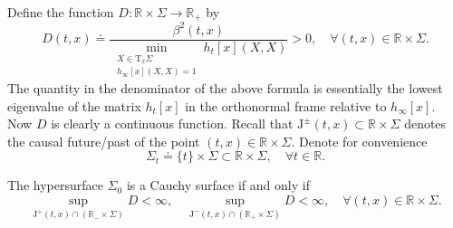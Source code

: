\documentclass{article}
\begin{document}
Define the function $D:\mathbb{R}\times\Sigma\to\mathbb{R}_+$ by
\begin{equation}
D(t,x)\doteq\frac{\beta^2(t,x)}{\min\limits_{\substack{X\in\mathrm{T}_x\Sigma\\h_\infty[x](X,X)=1}}h_t[x](X,X)}>0,\quad\forall (t,x)\in\mathbb{R}\times\Sigma.\label{DDef}
\end{equation}
The quantity in the denominator of the above formula is essentially the lowest eigenvalue of the matrix $h_t[x]$ in the orthonormal frame relative to $h_\infty[x]$. Now $D$ is clearly a continuous function. Recall that $\mathrm{J}^\pm(t,x)\subset\mathbb{R}\times\Sigma$ denotes the causal future/past of the point $(t,x)\in\mathbb{R}\times\Sigma$. Denote for convenience
$$
\Sigma_t\doteq\{t\}\times\Sigma\subset\mathbb{R}\times\Sigma,\quad\forall t\in\mathbb{R}.
$$
\begin{proposition}\label{0xSigmaCauchyProp} The hypersurface $\Sigma_0$ is a Cauchy surface if and only if
\begin{equation}
\sup\limits_{\mathrm{J}^+(t,x)\cap(\mathbb{R}_-\times\Sigma)}D<\infty,\quad\sup\limits_{\mathrm{J}^-(t,x)\cap(\mathbb{R}_+\times\Sigma)}D<\infty,\quad\forall (t,x)\in\mathbb{R}\times\Sigma.\label{0xSigmaCauchyProp:1}
\end{equation}
\end{proposition}
\end{document}
